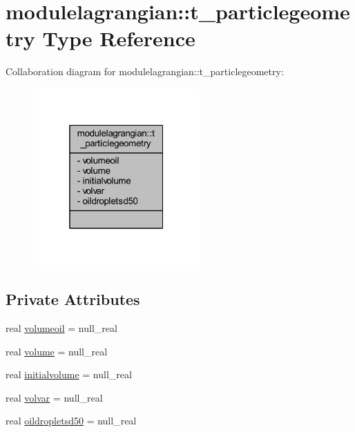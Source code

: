 \hypertarget{structmodulelagrangian_1_1t__particlegeometry}{}\section{modulelagrangian\+:\+:t\+\_\+particlegeometry Type Reference}
\label{structmodulelagrangian_1_1t__particlegeometry}


Collaboration diagram for modulelagrangian\+:\+:t\+\_\+particlegeometry\+:\nopagebreak
\begin{figure}[H]
\begin{center}
\leavevmode
\includegraphics[width=181pt]{structmodulelagrangian_1_1t__particlegeometry__coll__graph}
\end{center}
\end{figure}
\subsection*{Private Attributes}
\begin{DoxyCompactItemize}
\item 
real \mbox{\hyperlink{structmodulelagrangian_1_1t__particlegeometry_af5135e980b368936ee9a6406bb05b5d5}{volumeoil}} = null\+\_\+real
\item 
real \mbox{\hyperlink{structmodulelagrangian_1_1t__particlegeometry_a6688cea0fd1872a6d04fb8d7a3248de1}{volume}} = null\+\_\+real
\item 
real \mbox{\hyperlink{structmodulelagrangian_1_1t__particlegeometry_aae9db858844499cae4ba9ad564bf035a}{initialvolume}} = null\+\_\+real
\item 
real \mbox{\hyperlink{structmodulelagrangian_1_1t__particlegeometry_a169fed3f9759cebd05adee49f1c6e7c9}{volvar}} = null\+\_\+real
\item 
real \mbox{\hyperlink{structmodulelagrangian_1_1t__particlegeometry_abb9f38f08b7e08502d834a22c450964d}{oildropletsd50}} = null\+\_\+real
\end{DoxyCompactItemize}


